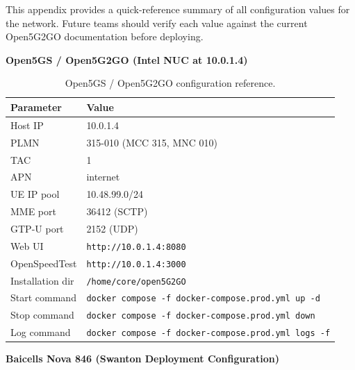 \documentclass[
    left=1.5in,
    right=1.25in,
    top=1.25in,
    bottom=1.25in
]{CalPolySeniorProject}
\begin{document}
\label{appendix:config}

This appendix provides a quick-reference summary of all configuration values for
the network. Future teams should verify each value against the current
Open5G2GO documentation before deploying.

\textbf{Open5GS / Open5G2GO (Intel NUC at 10.0.1.4)}

\begin{table}[!ht]
    \centering
    \caption[Open5GS configuration reference]{Open5GS / Open5G2GO configuration
    reference.}
    \vspace{0.5\baselineskip}
    \begin{tabular}{ll}
        \toprule
        \textbf{Parameter} & \textbf{Value} \\
        \midrule
        Host IP            & 10.0.1.4 \\
        PLMN               & 315-010 (MCC 315, MNC 010) \\
        TAC                & 1 \\
        APN                & internet \\
        UE IP pool         & 10.48.99.0/24 \\
        MME port           & 36412 (SCTP) \\
        GTP-U port         & 2152 (UDP) \\
        Web UI             & \texttt{http://10.0.1.4:8080} \\
        OpenSpeedTest      & \texttt{http://10.0.1.4:3000} \\
        Installation dir   & \texttt{/home/core/open5G2GO} \\
        Start command      & \texttt{docker compose -f docker-compose.prod.yml up -d} \\
        Stop command       & \texttt{docker compose -f docker-compose.prod.yml down} \\
        Log command        & \texttt{docker compose -f docker-compose.prod.yml logs -f} \\
        \bottomrule
    \end{tabular}
    \label{tab:open5gs_config}
\end{table}

\textbf{Baicells Nova 846 (Swanton Deployment Configuration)}
\end{document}

